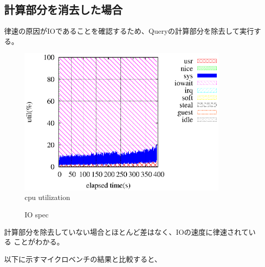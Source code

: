 \documentclass[11pt,a4paper]{jsarticle}
\newlength{\subfigwidth}
\newlength{\subfigcolsep}
\begin{document}
\subsection{計算部分を消去した場合}
律速の原因がIOであることを確認するため、Queryの計算部分を除去して実行す
る。
\begin{figure}[thbp]
 \begin{center}
  \includegraphics[width=100mm]{1idxscanmin_ra2048core1.eps}
 \end{center}
 \caption{cpu utilization}
 \label{fig:1idxmin2048core1}
\end{figure}

\begin{figure}[thbp]
 \setlength{\subfigwidth}{.5\linewidth}
 \addtolength{\subfigwidth}{-.5\subfigcolsep}
 \begin{minipage}[b]{\subfigwidth}
 \end{minipage}
  \begin{minipage}[b]{\subfigwidth}
  \end{minipage}
  \caption{IO spec}
  \label{fig:1idxramin0}
\end{figure}

計算部分を除去していない場合とほとんど差はなく、IOの速度に律速されている
ことがわかる。

以下に示すマイクロベンチの結果と比較すると、
\end{document}
